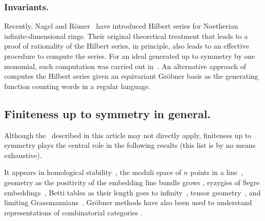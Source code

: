 \subsubsection{Invariants.}
Recently, Nagel and R\"omer~\cite{Nagel} have introduced Hilbert series for Noetherian infinite-dimensional rings. Their original theoretical treatment that leads to a proof of rationality of the Hilbert series, in principle, also leads to an effective procedure to compute the series. For an ideal generated up to symmetry by one monomial, such computation was carried out in~\cite{gunturkun2016equivariant}. An alternative approach of~\cite{krone2016hilbert} computes the Hilbert series given an equivariant Gr\"obner basis as the generating function counting words in a regular language.  

\subsection{Finiteness up to symmetry in general.}
Although the \EGBs\ described in this article may not directly apply, finiteness up to symmetry plays the central role in the following results (this list is by no means exhaustive).  

It appears in homological stability~\cite{randal2013homological, church2012homological},  the moduli space of $n$ points in a line~\cite{howard2009equations}, geometry as the positivity of the embedding line bundle grows \cite{ein2012asymptotic}, syzygies of Segre embeddings~\cite{snowden2013syzygies}, Betti tables as their length goes to infinity~\cite{ein2015asymptotics}, tensor geometry~\cite{draisma2014bounded, draisma2015finiteness}, and limiting Grassmannians~\cite{draisma2015plucker}.
Gr\"obner methods have also been used to understand representations of combinatorial categories \cite{sam2016grobner}.
